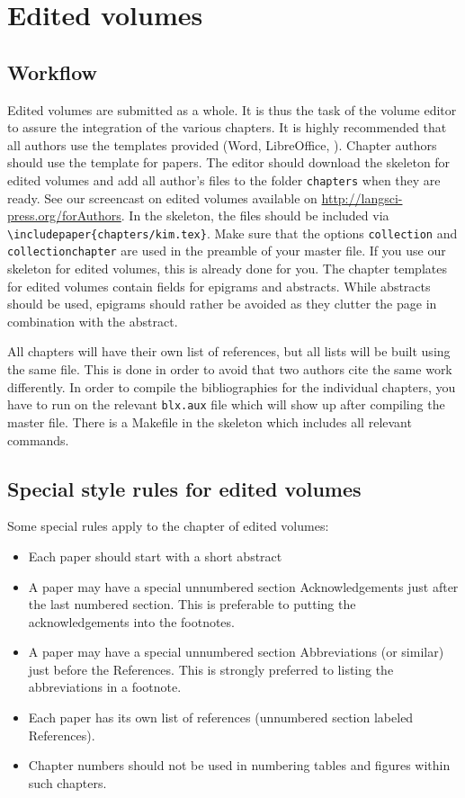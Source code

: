 \chapter{Edited volumes}
\section{Workflow}

Edited volumes are submitted as a whole. It is thus the task of the volume editor to assure the integration of the various chapters. It is highly recommended that all authors use the templates provided (Word, LibreOffice, \latex). 
Chapter authors should use the template for papers. The editor should download the skeleton for edited volumes and add all author's files to the folder \verb+chapters+ when they are ready. See our screencast on edited volumes available on \url{http://langsci-press.org/forAuthors}. In the skeleton, the files should be included via \verb+\includepaper{chapters/kim.tex}+. Make sure that the options \verb+collection+ and \verb+collectionchapter+ are used in the preamble of your master file. If you use our skeleton for edited volumes, this is already done for you. 
The chapter templates for edited volumes contain fields for epigrams and abstracts. While abstracts should be used, epigrams should rather be avoided as they clutter the page in combination with the abstract. 



All chapters will have their own list of references, but all lists will be built using the same {\bibtex} file. This is done in order to avoid that two authors cite the same work differently. In order to compile the bibliographies for the individual chapters, you have to run {\bibtex} on the relevant \verb+blx.aux+ file which will show up after compiling the master file. There is a Makefile in the skeleton which includes all relevant commands.
     
\section{Special style rules for edited volumes}
Some special rules apply to the chapter of edited volumes:
\begin{itemize}
\item Each paper should start with a short abstract
\item A paper may have a special unnumbered section Acknowledgements just after the last numbered section. This is preferable to putting the acknowledgements into the footnotes.
\item A paper may have a special unnumbered section Abbreviations (or similar) just before the References. This is strongly preferred to listing the abbreviations in a footnote.
\item Each paper has its own list of references (unnumbered section labeled References).
\item Chapter numbers should not be used in numbering tables and figures within such chapters.
\end{itemize}